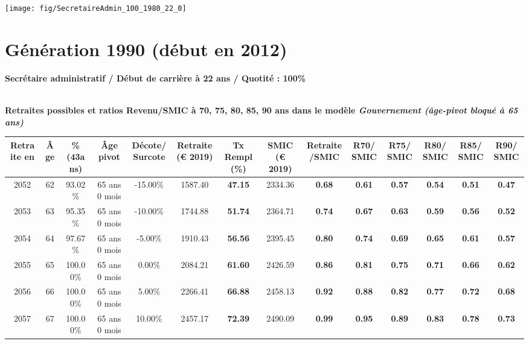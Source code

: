  {\hspace{-2.2cm}\texttt{[image: fig/SecretaireAdmin\_100\_1980\_22\_0]}} 

\newpage 
 
\section{Génération 1990 (début en 2012)\label{SecretaireAdmin_100_1990_22_0}} 
 
{\bf \noindent Secrétaire administratif / Début de carrière à 22 ans / Quotité : 100\%}  ~ 

 ~\\{\bf \noindent Retraites possibles et ratios Revenu/SMIC à 70, 75, 80, 85, 90 ans dans le modèle \emph{Gouvernement (âge-pivot bloqué à 65 ans)}}  
 
\begin{adjustbox}{max width=\textwidth} 
\begin{tabular}[htb]{|c|c||c|c|c||c|c||c|c||c|c|c|c|c|} 
\hline 
 Retraite en &  Âge &  \%(43ans) &  Âge pivot &  Décote/Surcote &  Retraite (\euro{} 2019) &  Tx Rempl(\%) &  SMIC (\euro{} 2019) &  Retraite/SMIC &  R70/SMIC &  R75/SMIC &  R80/SMIC &  R85/SMIC &  R90/SMIC \\ 
\hline \hline 
 2052 &  62 &  93.02\% &  65 ans 0 mois &  -15.00\% &  1587.40 &  {\bf 47.15} &  2334.36 &  {\bf {\color{red} 0.68}} &  {\bf {\color{red} 0.61}} &  {\bf {\color{red} 0.57}} &  {\bf {\color{red} 0.54}} &  {\bf {\color{red} 0.51}} &  {\bf {\color{red} 0.47}} \\ 
\hline 
 2053 &  63 &  95.35\% &  65 ans 0 mois &  -10.00\% &  1744.88 &  {\bf 51.74} &  2364.71 &  {\bf {\color{red} 0.74}} &  {\bf {\color{red} 0.67}} &  {\bf {\color{red} 0.63}} &  {\bf {\color{red} 0.59}} &  {\bf {\color{red} 0.56}} &  {\bf {\color{red} 0.52}} \\ 
\hline 
 2054 &  64 &  97.67\% &  65 ans 0 mois &  -5.00\% &  1910.43 &  {\bf 56.56} &  2395.45 &  {\bf {\color{red} 0.80}} &  {\bf {\color{red} 0.74}} &  {\bf {\color{red} 0.69}} &  {\bf {\color{red} 0.65}} &  {\bf {\color{red} 0.61}} &  {\bf {\color{red} 0.57}} \\ 
\hline 
 2055 &  65 &  100.00\% &  65 ans 0 mois &  0.00\% &  2084.21 &  {\bf 61.60} &  2426.59 &  {\bf {\color{red} 0.86}} &  {\bf {\color{red} 0.81}} &  {\bf {\color{red} 0.75}} &  {\bf {\color{red} 0.71}} &  {\bf {\color{red} 0.66}} &  {\bf {\color{red} 0.62}} \\ 
\hline 
 2056 &  66 &  100.00\% &  65 ans 0 mois &  5.00\% &  2266.41 &  {\bf 66.88} &  2458.13 &  {\bf {\color{red} 0.92}} &  {\bf {\color{red} 0.88}} &  {\bf {\color{red} 0.82}} &  {\bf {\color{red} 0.77}} &  {\bf {\color{red} 0.72}} &  {\bf {\color{red} 0.68}} \\ 
\hline 
 2057 &  67 &  100.00\% &  65 ans 0 mois &  10.00\% &  2457.17 &  {\bf 72.39} &  2490.09 &  {\bf {\color{red} 0.99}} &  {\bf {\color{red} 0.95}} &  {\bf {\color{red} 0.89}} &  {\bf {\color{red} 0.83}} &  {\bf {\color{red} 0.78}} &  {\bf {\color{red} 0.73}} \\ 
\hline 
\hline 
\end{tabular} 
\end{adjustbox} 
 
